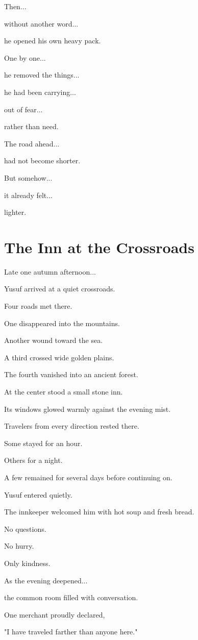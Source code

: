 \documentclass[12pt,openany]{book}
\begin{document}
Then...

without another word...

he opened his own heavy pack.

One by one...

he removed the things...

he had been carrying...

out of fear...

rather than need.

The road ahead...

had not become shorter.

But somehow...

it already felt...

lighter.
\section*{The Inn at the Crossroads}

Late one autumn afternoon...

Yusuf arrived at a quiet crossroads.

Four roads met there.

One disappeared into the mountains.

Another wound toward the sea.

A third crossed wide golden plains.

The fourth vanished into an ancient forest.

At the center stood a small stone inn.

Its windows glowed warmly against the evening mist.

Travelers from every direction rested there.

Some stayed for an hour.

Others for a night.

A few remained for several days before continuing on.

Yusuf entered quietly.

The innkeeper welcomed him with hot soup and fresh bread.

No questions.

No hurry.

Only kindness.

As the evening deepened...

the common room filled with conversation.

One merchant proudly declared,

"I have traveled farther than anyone here."
\end{document}
